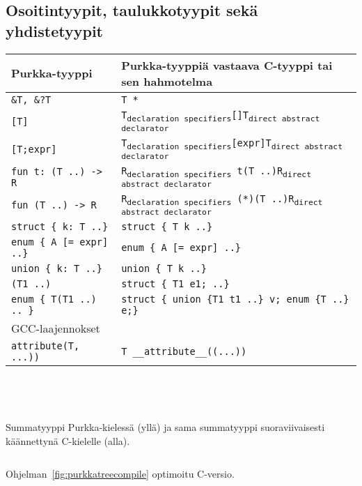 \subsection{Osoitintyypit, taulukkotyypit sekä yhdistetyypit}

\begin{tabular}{@{}ll@{}} \toprule
    Purkka-tyyppi & Purkka-tyyppiä vastaava C-tyyppi tai sen hahmotelma \\ \midrule
    \texttt{\&T, \&?T} & \texttt{T *} \\
    [0.2cm]

    \texttt{[T]} & \texttt{T\textsubscript{declaration specifiers}[]T\textsubscript{direct abstract declarator}} \\
    \texttt{[T;expr]} & \texttt{T\textsubscript{declaration specifiers}[expr]T\textsubscript{direct abstract declarator}} \\
    [0.2cm]

    \texttt{fun t: (T ..) -> R} & \texttt{R\textsubscript{declaration specifiers}~t(T ..)R\textsubscript{direct abstract declarator}} \\
    \texttt{fun (T ..) -> R} & \texttt{R\textsubscript{declaration specifiers}~(*)(T ..)R\textsubscript{direct abstract declarator}} \\
    [0.2cm]

    \texttt{struct \{ k: T ..\}} & \texttt{struct \{ T k ..\}} \\
    \texttt{enum \{ A [= expr] ..\}} & \texttt{enum \{ A [= expr] ..\}} \\
    \texttt{union \{ k: T ..\}} & \texttt{union \{ T k ..\}} \\
    [0.2cm]

    \texttt{(T1 ..)} & \texttt{struct \{ T1 e1; ..\}} \\
    \texttt{enum \{ T(T1 ..) .. \}} & \texttt{struct \{ union \{T1 t1 ..\} v; enum \{T ..\} e;\}} \\
    [0.2cm]

    GCC-laajennokset & \\
    \texttt{attribute(T, ...))} & \texttt{T \_\_attribute\_\_((...))} \\

    \bottomrule
\end{tabular} \\

\begin{listing}[ht!]
    \inputminted{Rust}{koodi/sumtype.prk}
    \inputminted{Rust}{koodi/sumtype.c}
    \caption{Summatyyppi Purkka-kielessä (yllä) ja sama summatyyppi
    suoraviivaisesti käännettynä C-kielelle (alla).}
    \label{fig:purkkatreecompile}
\end{listing}

\begin{listing}[ht!]
    \inputminted{Rust}{koodi/sumtype2.c}
    \caption{Ohjelman~\ref{fig:purkkatreecompile} optimoitu C-versio.}
    \label{fig:purkkatreecompile2}
\end{listing}
